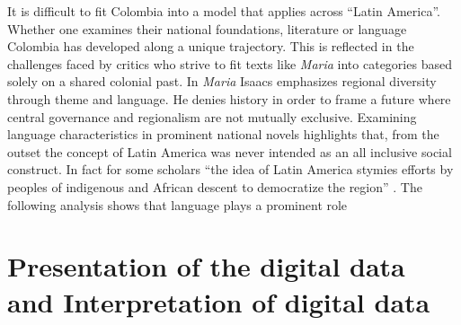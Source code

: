 It is difficult to fit Colombia into a model that applies across \enquote{Latin America}. Whether one examines their national foundations, literature or language Colombia has developed along a unique trajectory. This is reflected in the challenges faced by critics who strive to fit texts like \textit{Maria} into categories based solely on a shared colonial past. In \textit{Maria} Isaacs emphasizes regional diversity through theme and language. He denies history in order to frame a future where central governance and regionalism are not mutually exclusive. Examining language characteristics in prominent national novels highlights that, from the outset the concept of Latin America was never intended as an all inclusive social construct. In fact for some scholars \enquote{the idea of Latin America stymies efforts by peoples of indigenous and African descent to democratize the region} \autocite[1347]{Gobat2013}. The  following analysis shows that language plays a prominent role 



\section{Presentation of the digital data and Interpretation of digital data}


